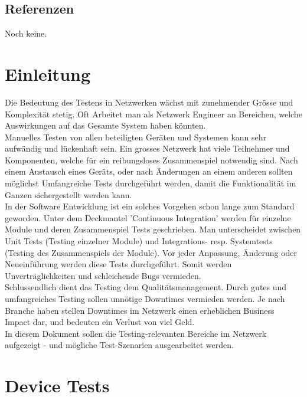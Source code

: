 \documentclass[a4,12pt]{scrartcl}
\begin{document}
\subsection{Referenzen}
\begin{description}
Noch keine.
\end{description}
\newpage
\section{Einleitung}
Die Bedeutung des Testens in Netzwerken wächst mit zunehmender Grösse und Komplexität stetig. Oft Arbeitet man als Netzwerk Engineer an Bereichen, welche Auswirkungen auf das Gesamte System haben könnten.\\

\noindent Manuelles Testen von allen beteiligten Geräten und Systemen kann sehr aufwändig und lückenhaft sein. Ein grosses Netzwerk hat viele Teilnehmer und Komponenten, welche für ein reibungsloses Zusammenspiel notwendig sind. Nach einem Austausch eines Geräts, oder nach Änderungen an einem anderen sollten möglichst Umfangreiche Tests durchgeführt werden, damit die Funktionalität im Ganzen sichergestellt werden kann.\\

\noindent In der Software Entwicklung ist ein solches Vorgehen schon lange zum Standard geworden. Unter dem Deckmantel 'Continuous Integration' werden für einzelne Module und deren Zusammenspiel Tests geschrieben. Man unterscheidet zwischen Unit Tests (Testing einzelner Module) und Integrations- resp. Systemtests (Testing des Zusammenspiels der Module). Vor jeder Anpassung, Änderung oder Neueinführung werden diese Tests durchgeführt. Somit werden Unverträglichkeiten und schleichende Bugs vermieden.\\

\noindent Schlussendlich dient das Testing dem Qualitätsmanagement. Durch gutes und umfangreiches Testing sollen unnötige Downtimes vermieden werden. Je nach Branche haben stellen Downtimes im Netzwerk einen erheblichen Business Impact dar, und bedeuten ein Verlust von viel Geld.\\

\noindent In diesem Dokument sollen die Testing-relevanten Bereiche im Netzwerk aufgezeigt - und mögliche Test-Szenarien ausgearbeitet werden. 
\section{Device Tests}
\end{document}
